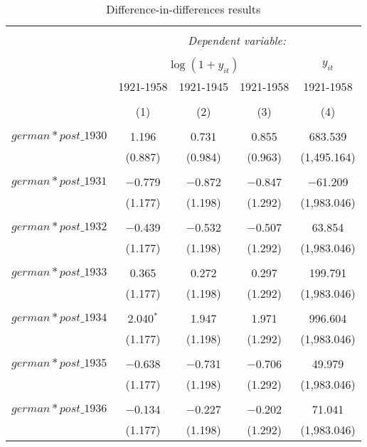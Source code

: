 
\begin{table}[!htbp] \centering 
  \caption{Difference-in-differences results} 
  \label{dif_table} 
\begin{tabular}{@{\extracolsep{5pt}}lcccc} 
\\[-1.8ex]\hline 
\hline \\[-1.8ex] 
 & \multicolumn{4}{c}{\textit{Dependent variable:}} \\ 
\cline{2-5} 
\\[-1.8ex] & \multicolumn{3}{c}{$\log(1 + y_{it})$} & $y_{it}$ \\ 
 & 1921-1958 & 1921-1945 & 1921-1958 & 1921-1958 \\ 
\\[-1.8ex] & (1) & (2) & (3) & (4)\\ 
\hline \\[-1.8ex] 
 $german*post\_1930$ & 1.196 & 0.731 & 0.855 & 683.539 \\ 
  & (0.887) & (0.984) & (0.963) & (1,495.164) \\ 
  & & & & \\ 
 $german*post\_1931$ & $-$0.779 & $-$0.872 & $-$0.847 & $-$61.209 \\ 
  & (1.177) & (1.198) & (1.292) & (1,983.046) \\ 
  & & & & \\ 
 $german*post\_1932$ & $-$0.439 & $-$0.532 & $-$0.507 & 63.854 \\ 
  & (1.177) & (1.198) & (1.292) & (1,983.046) \\ 
  & & & & \\ 
 $german*post\_1933$ & 0.365 & 0.272 & 0.297 & 199.791 \\ 
  & (1.177) & (1.198) & (1.292) & (1,983.046) \\ 
  & & & & \\ 
 $german*post\_1934$ & 2.040$^{*}$ & 1.947 & 1.971 & 996.604 \\ 
  & (1.177) & (1.198) & (1.292) & (1,983.046) \\ 
  & & & & \\ 
 $german*post\_1935$ & $-$0.638 & $-$0.731 & $-$0.706 & 49.979 \\ 
  & (1.177) & (1.198) & (1.292) & (1,983.046) \\ 
  & & & & \\ 
 $german*post\_1936$ & $-$0.134 & $-$0.227 & $-$0.202 & 71.041 \\ 
  & (1.177) & (1.198) & (1.292) & (1,983.046) \\ 

\end{tabular}
\end{table}

